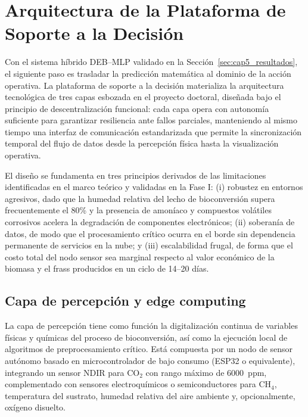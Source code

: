 \section{Arquitectura de la Plataforma de Soporte a la Decisión}
\label{sec:cap5_plataforma}

Con el sistema híbrido DEB--MLP validado en la Sección~\ref{sec:cap5_resultados}, el siguiente paso es trasladar la predicción matemática al dominio de la acción operativa. La plataforma de soporte a la decisión materializa la arquitectura tecnológica de tres capas esbozada en el proyecto doctoral, diseñada bajo el principio de descentralización funcional: cada capa opera con autonomía suficiente para garantizar resiliencia ante fallos parciales, manteniendo al mismo tiempo una interfaz de comunicación estandarizada que permite la sincronización temporal del flujo de datos desde la percepción física hasta la visualización operativa.

El diseño se fundamenta en tres principios derivados de las limitaciones identificadas en el marco teórico y validadas en la Fase I: (i) robustez en entornos agresivos, dado que la humedad relativa del lecho de bioconversión supera frecuentemente el 80\% y la presencia de amoníaco y compuestos volátiles corrosivos acelera la degradación de componentes electrónicos; (ii) soberanía de datos, de modo que el procesamiento crítico ocurra en el borde sin dependencia permanente de servicios en la nube; y (iii) escalabilidad frugal, de forma que el costo total del nodo sensor sea marginal respecto al valor económico de la biomasa y el frass producidos en un ciclo de 14--20 días.

\subsection{Capa de percepción y edge computing}
\label{subsec:cap5_capa_percepcion}

La capa de percepción tiene como función la digitalización continua de variables físicas y químicas del proceso de bioconversión, así como la ejecución local de algoritmos de preprocesamiento crítico. Está compuesta por un nodo de sensor autónomo basado en microcontrolador de bajo consumo (ESP32 o equivalente), integrando un sensor NDIR para CO$_2$ con rango máximo de 6000~ppm, complementado con sensores electroquímicos o semiconductores para CH$_4$, temperatura del sustrato, humedad relativa del aire ambiente y, opcionalmente, oxígeno disuelto.

